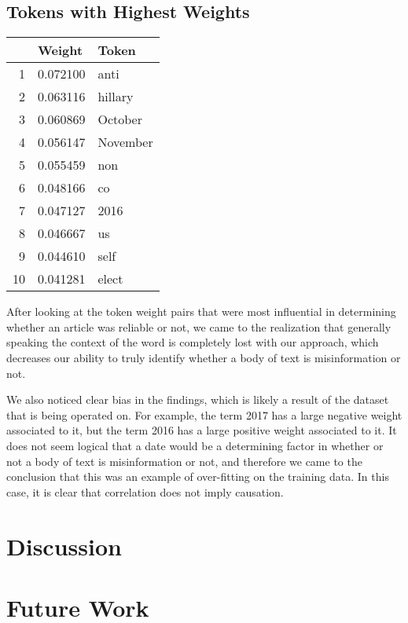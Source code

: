 \documentclass[12pt]{article}
\begin{document}
    \subsection{Tokens with Highest Weights}
	\begin{tabular}{r | l l}
		    & Weight            & Token         \\
		\hline
		1   & 0.072100	        & anti          \\
		2   & 0.063116		    & hillary       \\
		3   & 0.060869          & October       \\
		4   & 0.056147	        & November      \\
		5   & 0.055459	        & non           \\
		6   & 0.048166	        & co            \\
		7   & 0.047127	        & 2016          \\
		8   & 0.046667	        & us            \\
		9   & 0.044610	        & self          \\
		10  & 0.041281          & elect         \\
	\end{tabular}

	\break

    After looking at the token weight pairs that were most influential in determining whether an article was reliable or not, we came to the realization that generally speaking the context of the word is completely lost with our approach, which decreases our ability to truly identify whether a body of text is misinformation or not.

    We also noticed clear bias in the findings, which is likely a result of the dataset that is being operated on. For example, the term 2017 has a large negative weight associated to it, but the term 2016 has a large positive weight associated to it. It does not seem logical that a date would be a determining factor in whether or not a body of text is misinformation or not, and therefore we came to the conclusion that this was an example of over-fitting on the training data. In this case, it is clear that correlation does not imply causation.

	\section{Discussion}
	\section{Future Work}
\end{document}

